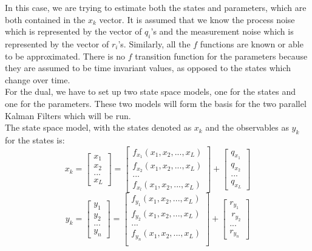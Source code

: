 In this case, we are trying to estimate both the states and parameters, which are both contained in the $x_k$ vector. It is assumed that we know the process noise which is represented by the vector of $q_i$'s and the measurement noise which is represented by the vector of $r_i$'s. Similarly, all the $f$ functions are known or able to be approximated. There is no $f$ transition function for the parameters because they are assumed to be time invariant values, as opposed to the states which change over time. 
\\
For the dual, we have to set up two state space models, one for the states and one for the parameters. These two models will form the basis for the two parallel Kalman Filters which will be run. \\
The state space model, with the states denoted as $x_k$ and the observables as $y_k$ for the states is:
        \begin{equation}
    x_k = 
    \begin{bmatrix}
    x_1\\
    x_2\\
    ...\\
    x_L
    \end{bmatrix} = 
    \begin{bmatrix}
    f_{x_1}(x_1, x_2, ..., x_L)\\
    f_{x_2}(x_1, x_2, ..., x_L)\\
    ...\\
    f_{x_l}(x_1, x_2, ..., x_L)
    \end{bmatrix} +
    \begin{bmatrix}
    q_{x_1}\\
    q_{x_2}\\
    ...\\
    q_{x_L}
    \end{bmatrix}
    \end{equation}
    \begin{equation}
    y_k = 
    \begin{bmatrix}
    y_1\\
    y_2\\
    ...\\
    y_n
    \end{bmatrix} = 
    \begin{bmatrix}
    f_{y_1}(x_1, x_2, ..., x_L)\\
    f_{y_2}(x_1, x_2, ..., x_L)\\
    ...\\
    f_{y_n}(x_1, x_2, ..., x_L)\\
    \end{bmatrix} +
    \begin{bmatrix}
    r_{y_1}\\\
    r_{y_2}\\
    ...\\
    r_{y_n}
    \end{bmatrix}
    \end{equation}
